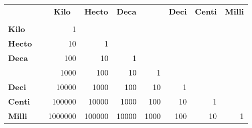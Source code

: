 \begin{center}
	\begin{tabular}{llrrrrrrr}
		\toprule	
			&&\multicolumn{1}{c}{\textbf{Kilo}} &\multicolumn{1}{c}{\textbf{Hecto}} & \multicolumn{1}{c}{\textbf{Deca}} &  & \multicolumn{1}{c}{\textbf{Deci}} & \multicolumn{1}{c}{\textbf{Centi}} & \multicolumn{1}{c}{\textbf{Milli}} \\ 
			&&\multicolumn{1}{c}{\textbf{\si{\kilo}}} & \multicolumn{1}{c}{\textbf{\si{\hecto}}} & \multicolumn{1}{c}{\textbf{\si{\deca}}} &  & \multicolumn{1}{c}{\textbf{\si{\deci}}} & \multicolumn{1}{c}{\textbf{\si{\centi}}} & \multicolumn{1}{c}{\textbf{\si{\milli}}} \\ 
			\midrule
		\textbf{Kilo}&\si{\kilo}	&\num{1}  &  &  &  &  &  &  \\ 
		\textbf{Hecto}&\si{\hecto}	& \num{10} &\num{1}  &  &  &  &  &  \\ 
		\textbf{Deca}&\si{\deca}	& \num{100} & \num{10} &\num{1}  &  &  &  &  \\ 
	&	& \num{1000} & \num{100} &\num{10}  &\num{1}  &  &  &  \\ 
		\textbf{Deci}&\si{\deci}	& \num{10000} &\num{1000}  &\num{100}  &\num{10}  & \num{1} &  &  \\ 
		\textbf{Centi}&\si{\centi}	&\num{100000}  & \num{10000} & \num{1000} & \num{100} &\num{10}  & \num{1} &  \\ 
		\textbf{Milli}&\si{\milli}	&\num{1000000}  &\num{100000}  & \num{10000} &\num{1000}  & \num{100} & \num{10} & \num{1} \\ 
		\bottomrule
	\end{tabular} 
\end{center}
